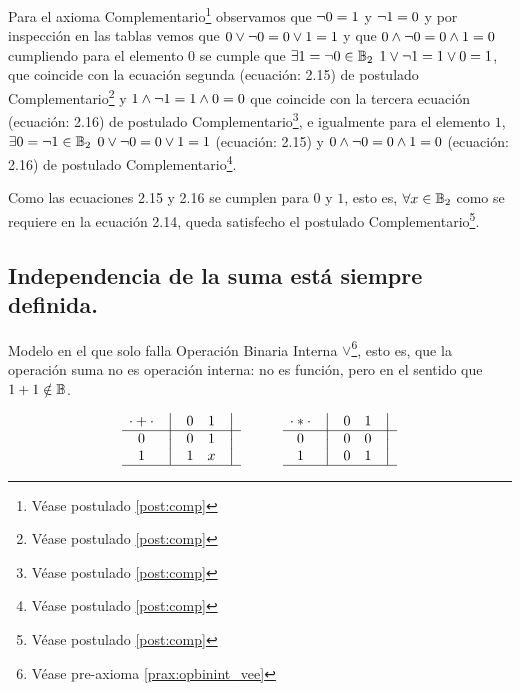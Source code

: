 	Para el axioma Complementario\footnote{Véase postulado \ref{post:comp}} observamos que \(\neg 0 = 1\) y
\(\neg 1 = 0\) y por inspección en las tablas vemos que
\(0 \vee \neg 0 = 0 \vee 1 = 1\) y que
\(0 \wedge \neg 0 = 0 \wedge 1 = 0\) cumpliendo para
el elemento \(0\) se cumple que \(\exists 1 = \neg 0 \in \mathbb{B}_2 \)
\(1 \vee \neg 1 = 1 \vee 0 = 1\), que coincide con
la ecuación segunda (ecuación: 2.15) de postulado Complementario\footnote{Véase postulado \ref{post:comp}} y
\(1 \wedge \neg 1=1 \wedge 0 = 0\) que coincide con la
tercera ecuación (ecuación: 2.16) de postulado Complementario\footnote{Véase postulado \ref{post:comp}}, e igualmente para el
elemento \( 1 \), \(\exists 0 = \neg 1 \in \mathbb{B}_2 \) \(
0 \vee \neg 0 = 0 \vee 1 = 1\) (ecuación: 2.15) y
\(0 \wedge \neg 0 =0 \wedge 1 = 0\) (ecuación: 2.16)
de postulado Complementario\footnote{Véase postulado \ref{post:comp}}.




	Como las ecuaciones 2.15 y 2.16 se cumplen para \(0\) y \(1\), esto es,
\(\forall x \in \mathbb{B}_2\) como se requiere en la ecuación 2.14, queda
satisfecho el postulado Complementario\footnote{Véase postulado \ref{post:comp}}.



\subsection{Independencia de la suma está siempre definida.}



Modelo en el que solo falla Operación Binaria Interna $\vee$\footnote{Véase pre-axioma \ref{prax:opbinint_vee}}, esto es, que la operación suma
no es operación interna: no es función, pero en el sentido que \(1 + 1 \notin
\mathbb{B}\).


\[
    \begin{matrix}
        {\cdot + \cdot} & \big{\vert} & {0} & {1} & \big{\vert} \\
        \hline
        {0}             & \big{\vert} & {0} & {1} & \big{\vert} \\
        {1}             & \big{\vert} & {1} & {x} & \big{\vert} \\
        \hline
    \end{matrix}
    \qquad\qquad
    \begin{matrix}
        {\cdot * \cdot} & \big{\vert} & {0} & {1} & \big{\vert} \\
        \hline
        {0}                   & \big{\vert} & {0} & {0} & \big{\vert} \\
        {1}                   & \big{\vert} & {0} & {1} & \big{\vert} \\
        \hline
    \end{matrix}
\]




